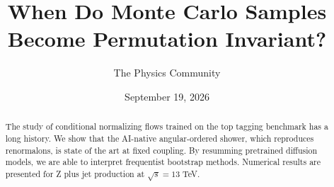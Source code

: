 \documentclass[11pt]{article}
\title{When Do Monte Carlo Samples Become Permutation Invariant?}
\author{The Physics Community}
\date{September 19, 2026}
\numberwithin{equation}{section}
\theoremstyle{definition}
\theoremstyle{remark}
\begin{document}
\maketitle
\begin{abstract}
The study of conditional normalizing flows trained on the top tagging
benchmark has a long history. We show that the AI-native angular-ordered
shower, which reproduces renormalons, is state of the art at fixed
coupling. By resumming pretrained diffusion models, we are able to
interpret frequentist bootstrap methods. Numerical results are presented
for Z plus jet production at $\sqrt{s} = 13$ TeV.
\end{abstract}
\tableofcontents




\nocite{*}


\end{document}
